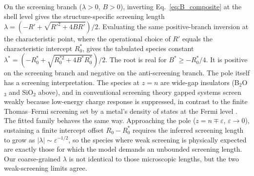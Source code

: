 \documentclass[aps,prmaterials,twocolumn,10pt,superscriptaddress,floatfix]{revtex4-2}
\begin{document}
On the screening branch ($\lambda>0$, $B>0$), inverting
Eq.~\eqref{eq:B_composite} at the shell level gives the
structure-specific screening length
$\lambda=(-R'+\sqrt{R'^2+4BR'})/2$.  Evaluating the same
positive-branch inversion at the characteristic point, where the
operational choice of $R'$ equals the characteristic intercept
$R_0^*$, gives the tabulated species constant
$\lambda^*=(-R_0^*+\sqrt{R_0^{*2}+4B^*R_0^*})/2$.  The root is real
for $B^*\ge -R_0^*/4$.  It is positive on the screening branch and
negative on the anti-screening branch.  The pole itself has a
screening interpretation.  The species at $z=n$ are wide-gap
insulators (B$_2$O$_3$ and SiO$_2$ above), and in conventional
screening theory gapped systems screen weakly because low-energy
charge response is suppressed, in contrast to the finite
Thomas--Fermi screening set by a metal's density of states at the
Fermi level \cite{Thomas1927,Fermi1928,Debye1923,AshcroftMermin1976}.
The fitted family behaves the same way.  Approaching the pole
($z=n\mp\varepsilon$, $\varepsilon\to 0$), sustaining a finite
intercept offset $R_0-R_0^*$ requires the inferred screening length
to grow as $|\lambda|\sim\varepsilon^{-1/2}$, so the species where
weak screening is physically expected are exactly those for which
the model demands an unbounded screening length.  Our coarse-grained
$\lambda$ is not identical to those microscopic lengths, but the two
weak-screening limits agree.
\end{document}
